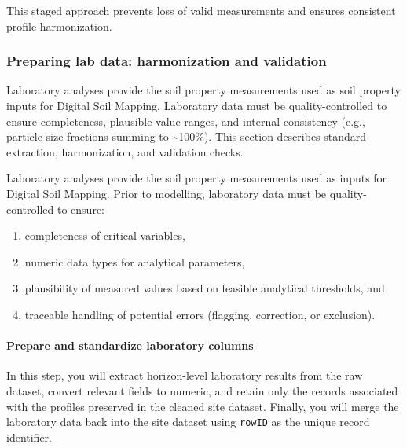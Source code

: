 \documentclass[
  10pt,
  b5paper,
  oneside]{book}
\providecommand{\tightlist}{%
  \setlength{\itemsep}{0pt}\setlength{\parskip}{0pt}}
\begin{document}
This staged approach prevents loss of valid measurements and ensures consistent profile harmonization.

\subsubsection{Preparing lab data: harmonization and validation}\label{preparing-lab-data-harmonization-and-validation}

Laboratory analyses provide the soil property measurements used as soil property inputs for Digital Soil Mapping. Laboratory data must be quality-controlled to ensure completeness, plausible value ranges, and internal consistency (e.g., particle-size fractions summing to \textasciitilde100\%). This section describes standard extraction, harmonization, and validation checks.

Laboratory analyses provide the soil property measurements used as inputs for Digital Soil Mapping. Prior to modelling, laboratory data must be quality-controlled to ensure:

\begin{enumerate}
\def\labelenumi{(\roman{enumi})}
\tightlist
\item
  completeness of critical variables,
\item
  numeric data types for analytical parameters,
\item
  plausibility of measured values based on feasible analytical thresholds, and
\item
  traceable handling of potential errors (flagging, correction, or exclusion).
\end{enumerate}

\paragraph*{Prepare and standardize laboratory columns}\label{prepare-and-standardize-laboratory-columns}

In this step, you will extract horizon-level laboratory results from the raw dataset, convert relevant fields to numeric, and retain only the records associated with the profiles preserved in the cleaned site dataset. Finally, you will merge the laboratory data back into the site dataset using \texttt{rowID} as the unique record identifier.
\end{document}
